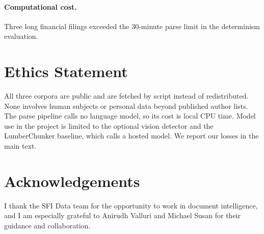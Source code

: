 \documentclass[11pt]{article}
\begin{document}
\paragraph{Computational cost.} Three long financial filings exceeded the 30-minute parse limit in the determinism evaluation.

\section*{Ethics Statement}

All three corpora are public and are fetched by script instead of redistributed. None involves human subjects or personal data beyond published author lists. The parse pipeline calls no language model, so its cost is local CPU time. Model use in the project is limited to the optional vision detector and the LumberChunker baseline, which calls a hosted model. We report our losses in the main text.

\section*{Acknowledgements}

I thank the SFI Data team for the opportunity to work in document intelligence, and I am especially grateful to Anirudh Valluri and Michael Susan for their guidance and collaboration.



\end{document}
